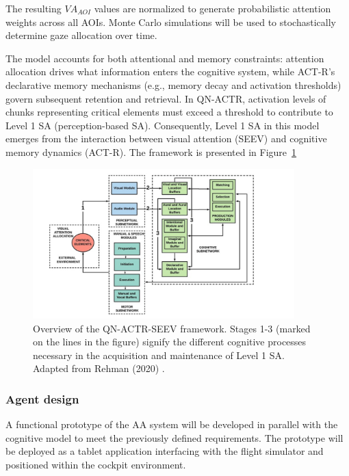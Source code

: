 \documentclass[12pt,a4paper]{article} %
\begin{document}
	The resulting $VA_{AOI}$ values are normalized to generate probabilistic attention weights across all AOIs. Monte Carlo simulations will be used to stochastically determine gaze allocation over time.
	
	The model accounts for both attentional and memory constraints: attention allocation drives what information enters the cognitive system, while ACT-R's declarative memory mechanisms (e.g., memory decay and activation thresholds) govern subsequent retention and retrieval. In QN-ACTR, activation levels of chunks representing critical elements must exceed a threshold to contribute to Level 1 SA (perception-based SA). Consequently, Level 1 SA in this model emerges from the interaction between visual attention (SEEV) and cognitive memory dynamics (ACT-R). The framework is presented in Figure~\ref{fig:qn-actr-seev}

	\begin{figure}[H]
    \centering
    \includegraphics[width=0.9\textwidth]{./images/qn-actr-sa-synoptic.png}
    \caption{Overview of the QN-ACTR-SEEV framework. Stages 1-3 (marked on the lines in the figure) signify the different cognitive processes necessary in the acquisition and maintenance of Level 1 SA. Adapted from Rehman (2020) \parencite{rehman_phd_thesis}.}
    \label{fig:qn-actr-seev}
	\end{figure}

	\subsubsection{Agent design}
	A functional prototype of the AA system will be developed in parallel with the cognitive model to meet the previously defined requirements. The prototype will be deployed as a tablet application interfacing with the flight simulator and positioned within the cockpit environment.
\end{document}

